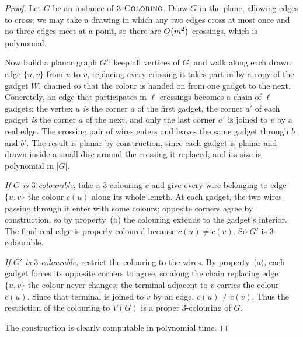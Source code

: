 \begin{proof}
Let $G$ be an instance of $\textsc{3-Coloring}$. Draw $G$ in the plane, allowing edges
to cross; we may take a drawing in which any two edges cross at most once and
no three edges meet at a point, so there are $O\!\left(m^2\right)$ crossings, which is
polynomial.

Now build a planar graph $G'$: keep all vertices of $G$, and walk along each
drawn edge $\{u,v\}$ from $u$ to $v$, replacing every crossing it takes part in
by a copy of the gadget $W$, chained so that the colour is handed on from one
gadget to the next. Concretely, an edge that participates in $\ell$ crossings
becomes a chain of $\ell$ gadgets: the vertex $u$ \emph{is} the corner $a$ of
the first gadget, the corner $a'$ of each gadget \emph{is} the corner $a$ of the
next, and only the last corner $a'$ is joined to $v$ by a real edge. The crossing pair of wires
enters and leaves the same gadget through $b$ and $b'$. The result is planar by
construction, since each gadget is planar and drawn inside a small disc around
the crossing it replaced, and its size is polynomial in $|G|$.

\emph{If $G$ is $3$-colourable}, take a $3$-colouring $c$ and give every wire
belonging to edge $\{u,v\}$ the colour $c(u)$ along its whole length. At each
gadget, the two wires passing through it enter with some colours; opposite
corners agree by construction, so by property~(b) the colouring extends to the
gadget's interior. The final real edge is properly coloured because
$c(u) \ne c(v)$. So $G'$ is $3$-colourable.

\emph{If $G'$ is $3$-colourable}, restrict the colouring to the wires. By
property~(a), each gadget forces its opposite corners to agree, so along the
chain replacing edge $\{u,v\}$ the colour never changes: the terminal adjacent
to $v$ carries the colour $c(u)$. Since that terminal is joined to $v$ by an
edge, $c(u) \ne c(v)$. Thus the restriction of the colouring to $V(G)$ is a
proper $3$-colouring of $G$.

The construction is clearly computable in polynomial time.
\end{proof}

